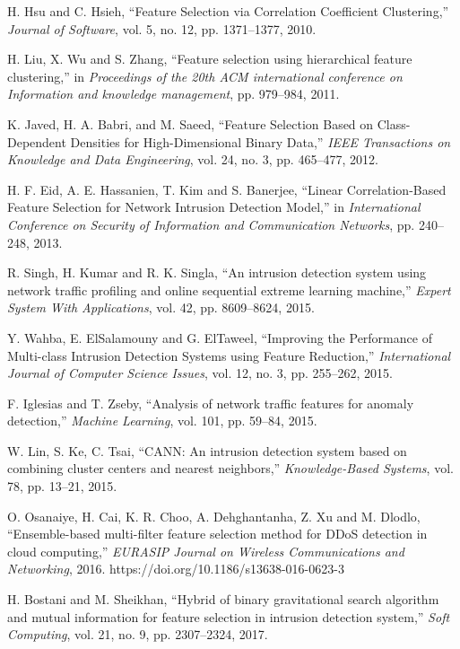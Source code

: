 \documentclass{ieeeaccess}
\theoremstyle{definition}
\begin{document}
\begin{thebibliography}{00}
    H. Hsu and C. Hsieh, ``Feature Selection via Correlation Coefficient Clustering,'' \emph{Journal of Software}, vol. 5, no. 12, pp. 1371--1377, 2010.

    H. Liu, X. Wu and S. Zhang, ``Feature selection using hierarchical feature clustering,'' in \emph{Proceedings of the 20th ACM international conference on Information and knowledge management}, pp. 979--984, 2011.

    K. Javed, H. A. Babri, and M. Saeed, ``Feature Selection Based on Class-Dependent Densities for High-Dimensional Binary Data,'' \emph{IEEE Transactions on Knowledge and Data Engineering}, vol. 24, no. 3, pp. 465--477, 2012.

    H. F. Eid, A. E. Hassanien, T. Kim and S. Banerjee, ``Linear Correlation-Based Feature Selection for Network Intrusion Detection Model,'' in \emph{International Conference on Security of Information and Communication Networks}, pp. 240--248, 2013.

    R. Singh, H. Kumar and R. K. Singla, ``An intrusion detection system using network traffic profiling and online sequential extreme learning machine,'' \emph{Expert System With Applications}, vol. 42, pp. 8609--8624, 2015.

    Y. Wahba, E. ElSalamouny and G. ElTaweel, ``Improving the Performance of Multi-class Intrusion Detection Systems using Feature Reduction,'' \emph{International Journal of Computer Science Issues}, vol. 12, no. 3, pp. 255--262, 2015.

    F. Iglesias and T. Zseby, ``Analysis of network traffic features for anomaly detection,'' \emph{Machine Learning}, vol. 101, pp. 59--84, 2015.

    W. Lin, S. Ke, C. Tsai, ``CANN: An intrusion detection system based on combining cluster centers and nearest neighbors,'' \emph{Knowledge-Based Systems}, vol. 78, pp. 13--21, 2015.

    O. Osanaiye, H. Cai, K. R. Choo, A. Dehghantanha, Z. Xu and M. Dlodlo, ``Ensemble-based multi-filter feature selection method for DDoS detection in cloud computing,'' \emph{EURASIP Journal on Wireless Communications and Networking}, 2016. https://doi.org/10.1186/s13638-016-0623-3

    H. Bostani and M. Sheikhan, ``Hybrid of binary gravitational search algorithm and mutual information for feature selection in intrusion detection system,'' \emph{Soft Computing}, vol. 21, no. 9, pp. 2307--2324, 2017.


\end{thebibliography}
\end{document}
